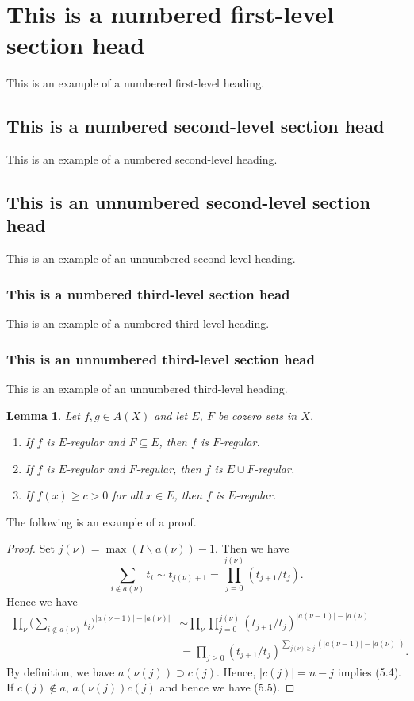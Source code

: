 \documentclass{mcom-l}
\newtheorem{lemma}[theorem]{Lemma}
\theoremstyle{definition}
\theoremstyle{remark}
\numberwithin{equation}{section}
\newcommand{\abs}[1]{\lvert#1\rvert}
\begin{document}
\section{This is a numbered first-level section head}
This is an example of a numbered first-level heading.

\subsection{This is a numbered second-level section head}
This is an example of a numbered second-level heading.

\subsection*{This is an unnumbered second-level section head}
This is an example of an unnumbered second-level heading.

\subsubsection{This is a numbered third-level section head}
This is an example of a numbered third-level heading.

\subsubsection*{This is an unnumbered third-level section head}
This is an example of an unnumbered third-level heading.

\begin{lemma}
Let $f, g\in  A(X)$ and let $E$, $F$ be cozero
sets in $X$.
\begin{enumerate}
\item If $f$ is $E$-regular and $F\subseteq E$, then $f$ is $F$-regular.

\item If $f$ is $E$-regular and $F$-regular, then $f$ is $E\cup
F$-regular.

\item If $f(x)\ge c>0$ for all $x\in E$, then $f$ is $E$-regular.

\end{enumerate}
\end{lemma}

The following is an example of a proof.

\begin{proof} Set $j(\nu)=\max(I\backslash a(\nu))-1$. Then we have
\[
\sum_{i\notin a(\nu)}t_i\sim t_{j(\nu)+1}
  =\prod^{j(\nu)}_{j=0}(t_{j+1}/t_j).
\]
Hence we have
\begin{equation}
\begin{split}
\prod_\nu\biggl(\sum_{i\notin
  a(\nu)}t_i\biggr)^{\abs{a(\nu-1)}-\abs{a(\nu)}}
&\sim\prod_\nu\prod^{j(\nu)}_{j=0}
  (t_{j+1}/t_j)^{\abs{a(\nu-1)}-\abs{a(\nu)}}\\
&=\prod_{j\ge 0}(t_{j+1}/t_j)^{
  \sum_{j(\nu)\ge j}(\abs{a(\nu-1)}-\abs{a(\nu)})}.
\end{split}
\end{equation}
By definition, we have $a(\nu(j))\supset c(j)$. Hence, $\abs{c(j)}=n-j$
implies (5.4). If $c(j)\notin a$, $a(\nu(j))c(j)$ and hence
we have (5.5).
\end{proof}
\end{document}
